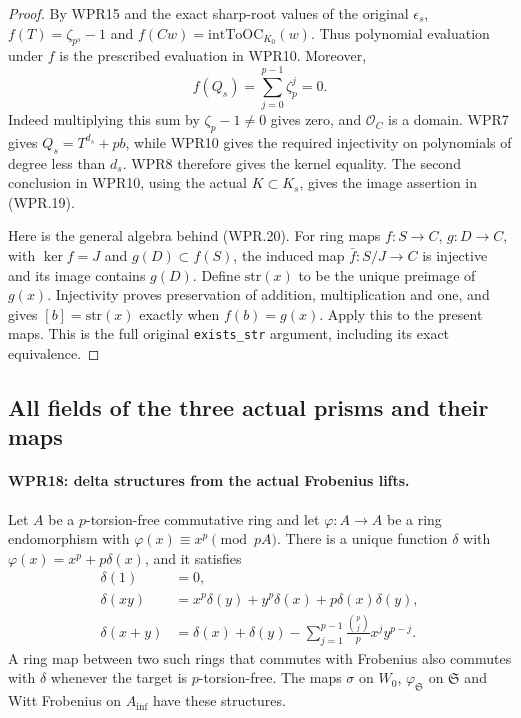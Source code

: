 \begin{proof}
By WPR15 and the exact sharp-root values of the original
$\epsilon_s$, $f(T)=\zeta_{p^s}-1$ and
$f(Cw)=\mathrm{intToOC}_{K_0}(w)$. Thus polynomial evaluation
under $f$ is the prescribed evaluation in WPR10. Moreover,
\[
 f(Q_s)=\sum_{j=0}^{p-1}\zeta_p^j=0.
\]
Indeed multiplying this sum by $\zeta_p-1\neq0$ gives zero,
and $\mathcal O_C$ is a domain. WPR7 gives
$Q_s=T^{d_s}+pb$, while WPR10 gives the required injectivity
on polynomials of degree less than $d_s$. WPR8 therefore gives
the kernel equality. The second conclusion in WPR10, using the
actual $K\subset K_s$, gives the image assertion in (WPR.19).

Here is the general algebra behind (WPR.20). For ring maps
$f:S\to C$, $g:D\to C$, with $\ker f=J$ and
$g(D)\subset f(S)$, the induced map $\bar f:S/J\to C$
is injective and its image contains $g(D)$. Define
$\mathrm{str}(x)$ to be the unique preimage of $g(x)$.
Injectivity proves preservation of addition, multiplication and
one, and gives $[b]=\mathrm{str}(x)$ exactly when $f(b)=g(x)$.
Apply this to the present maps. This is the full original
\texttt{exists\_str} argument, including its exact equivalence.
\end{proof}

\subsection{All fields of the three actual prisms and their maps}

\paragraph{WPR18: delta structures from the actual Frobenius lifts.}
\label{claim:WPR18}
Let $A$ be a $p$-torsion-free commutative ring and let
$\varphi:A\to A$ be a ring endomorphism with
$\varphi(x)\equiv x^p\pmod{pA}$. There is a unique function
$\delta$ with $\varphi(x)=x^p+p\delta(x)$, and it satisfies
\[
 \begin{split}
 \delta(1)&=0,\\
 \delta(xy)&=x^p\delta(y)+y^p\delta(x)+p\delta(x)\delta(y),\\
 \delta(x+y)&=\delta(x)+\delta(y)
       -\sum_{j=1}^{p-1}\frac{\binom pj}{p}x^jy^{p-j}.
 \end{split}                                                       \tag{WPR.21}
\]
A ring map between two such rings that commutes with Frobenius
also commutes with $\delta$ whenever the target is $p$-torsion-free.
The maps $\sigma$ on $W_0$, $\varphi_{\mathfrak S}$ on
$\mathfrak S$ and Witt Frobenius on $A_{\mathrm{inf}}$ have these structures.

